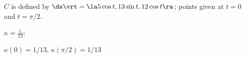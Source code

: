{$C$ is defined by $\ds \vrt = \la 5\cos t,13\sin t, 12\cos t\ra $; points given at $t=0$ and $t=\pi/2$. 
}
{$\kappa = \frac{1}{13}$;

$\kappa(0) = 1/13$, $\kappa(\pi/2) = 1/13$
}